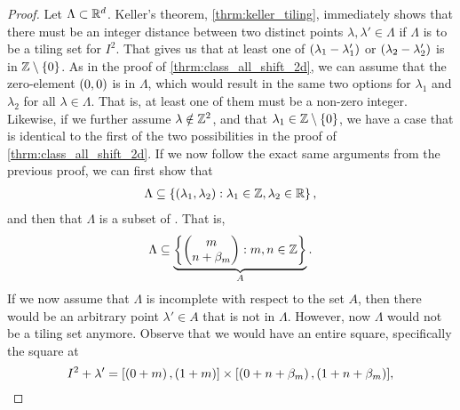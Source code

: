 \documentclass[../thesis.tex]{subfiles}
\begin{document}
\begin{proof}
    Let $\Lambda \subset \mathbb{R}^d$. Keller's theorem, \cref{thrm:keller_tiling}, immediately shows that there must be an integer distance between two distinct points $\lambda,\lambda' \in \Lambda$ if $\Lambda$ is to be a tiling set for $I^2$. That gives us that at least one of $(\lambda_1-\lambda_1')$ or $(\lambda_2-\lambda_2')$ is in $\mathbb{Z}\setminus\{0\}$. As in the proof of \cref{thrm:class_all_shift_2d}, we can assume that the zero-element $(0,0)$ is in $\Lambda$, which would result in the same two options for $\lambda_1$ and $\lambda_2$ for all $\lambda\in \Lambda$. That is, at least one of them must be a non-zero integer. Likewise, if we further assume $\lambda\notin \mathbb{Z}^2$, and that $\lambda_1 \in\mathbb{Z}\setminus\{0\}$, we have a case that is identical to the first of the two possibilities in the proof of \cref{thrm:class_all_shift_2d}. If we now follow the exact same arguments from the previous proof, we can first show that 
    \begin{align*}  %
        \Lambda \subseteq \braqMed{ \bracMed{\lambda_1, \lambda_2} : \lambda_1 \in \Z, \lambda_2 \in \R},
    \end{align*}
    and then that $\Lambda$ is a subset of . That is,
    \begin{equation*}  %
        \Lambda \subseteq \underbrace{\braqMed{\begin{pmatrix} m \\ n+\beta_m\end{pmatrix} : m,n \in \Z}}_{A}.
    \end{equation*}
    If we now assume that $\Lambda$ is incomplete with respect to the set $A$, then there would be an arbitrary point $\lambda' \in A$ that is not in $\Lambda$. However, now $\Lambda$ would not be a tiling set anymore. Observe that we would have an entire square, specifically the square at
    \begin{equation*}
        I^2 + \lambda' = \bras{\bracMed{0+m},\bracMed{1+m}}\times \bras{\bracMed{0+n+\beta_m},\bracMed{1+n+\beta_m}}, 

\end{equation*}
\end{proof}
\end{document}

